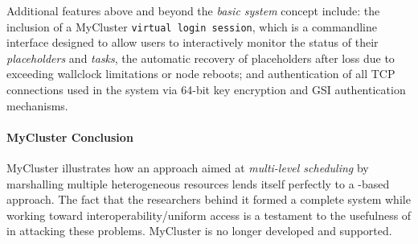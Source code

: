 \documentclass{sig-alternate}
\begin{document}
Additional features above and beyond the \textit{basic \pilotjob system}
concept include: the inclusion of a MyCluster \texttt{virtual login session},
which is a commandline interface designed to allow users to interactively
monitor the status of their \textit{placeholders} and \textit{tasks}, the
automatic recovery of placeholders after loss due to exceeding wallclock
limitations or node reboots; and authentication of all TCP connections used in
the system via 64-bit key encryption and GSI authentication mechanisms.

\paragraph{MyCluster Conclusion}
MyCluster illustrates how an approach aimed at \textit{multi-level
scheduling} by marshalling multiple heterogeneous resources lends
itself perfectly to a \pilotjob-based approach.  The fact that
the researchers behind it formed a complete \pilotjob system
while working toward interoperability/uniform access is a testament
to the usefulness of \pilotjobs in attacking these problems.
MyCluster is no longer developed and supported.


\end{document}
